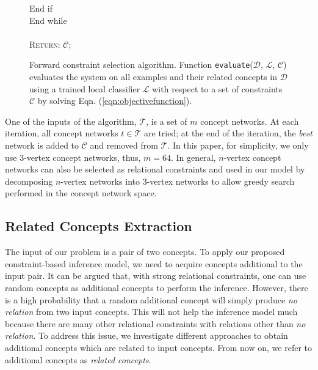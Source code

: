 \begin{figure}[!t]
\begin{centering}
{{\begin{minipage}{6in}
\begin{tabbing}
            \qquad \qquad End if \\
            \qquad End while \\
            \\
            \qquad \textsc{Return}: $\mathcal{C}$; \\
          \end{tabbing}
        \end{minipage}
      }
    }
  \end{centering}
  \caption{
    \label{alg:forwardselection}
    Forward constraint selection algorithm. Function
    \texttt{evaluate}($\mathcal{D}$, $\mathcal{L}$, $\mathcal{C}$)
    evaluates the system on all examples and their related concepts in
    $\mathcal{D}$ using a trained local classifier $\mathcal{L}$ with
    respect to a set of constraints $\mathcal{C}$ by solving
    Eqn. (\ref{eqn:objectivefunction}).}
\end{figure}

One of the inputs of the algorithm, $\mathcal{T}$, is a set of $m$
concept networks. At each iteration, all concept networks $t \in
\mathcal{T}$ are tried; at the end of the iteration, the {\em
  best} network is added to $\mathcal{C}$ and removed from
$\mathcal{T}$. In this paper, for simplicity, we only use 3-vertex
concept networks, thus, $m = 64$. In general, $n$-vertex concept
networks can also be selected as relational constraints and used in
our model by decomposing $n$-vertex networks into $3$-vertex
networks to allow greedy search performed in the concept network
space.


\subsection{Related Concepts Extraction}
\label{sec:rel-con-ext}

The input of our problem is a pair of two concepts. To apply our
proposed constraint-based inference model, we need to acquire concepts
additional to the input pair. It can be argued that, with strong
relational constraints, one can use random concepts as additional
concepts to perform the inference. However, there is a high
probability that a random additional concept will simply produce {\em
  no relation} from two input concepts. This will not help the
inference model much because there are many other relational constraints
with relations other than {\em no relation}. To address this issue, we
investigate different approaches to obtain additional concepts which
are related to input concepts. From now on, we refer to additional
concepts as {\em related concepts}.


